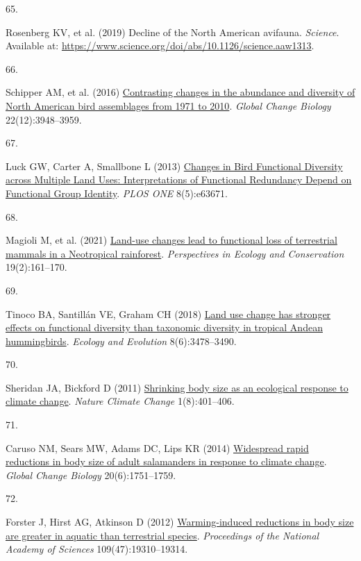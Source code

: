 \documentclass{article}
\newlength{\cslhangindent}
\newlength{\csllabelwidth}
\newlength{\cslentryspacingunit} %
\newenvironment{CSLReferences}[2] %
 {%
  \setlength{\parindent}{0pt}
  \ifodd #1
  \let\oldpar\par
  \def\par{\hangindent=\cslhangindent\oldpar}
  \fi
  \setlength{\parskip}{#2\cslentryspacingunit}
 }%
 {}
\newcommand{\CSLLeftMargin}[1]{\parbox[t]{\csllabelwidth}{#1}}
\newcommand{\CSLRightInline}[1]{\parbox[t]{\linewidth - \csllabelwidth}{#1}\break}
\begin{document}
\begin{CSLReferences}{0}{0}
\leavevmode{}%
\CSLLeftMargin{65. }%
\CSLRightInline{Rosenberg KV, et al. (2019) Decline of the North
American avifauna. \emph{Science}. Available at:
\url{https://www.science.org/doi/abs/10.1126/science.aaw1313}.}

\leavevmode{}%
\CSLLeftMargin{66. }%
\CSLRightInline{Schipper AM, et al. (2016)
\href{https://doi.org/10.1111/gcb.13292}{Contrasting changes in the
abundance and diversity of North American bird assemblages from 1971 to
2010}. \emph{Global Change Biology} 22(12):3948--3959.}

\leavevmode{}%
\CSLLeftMargin{67. }%
\CSLRightInline{Luck GW, Carter A, Smallbone L (2013)
\href{https://doi.org/10.1371/journal.pone.0063671}{Changes in Bird
Functional Diversity across Multiple Land Uses: Interpretations of
Functional Redundancy Depend on Functional Group Identity}. \emph{PLOS
ONE} 8(5):e63671.}

\leavevmode{}%
\CSLLeftMargin{68. }%
\CSLRightInline{Magioli M, et al. (2021)
\href{https://doi.org/10.1016/j.pecon.2021.02.006}{Land-use changes lead
to functional loss of terrestrial mammals in a Neotropical rainforest}.
\emph{Perspectives in Ecology and Conservation} 19(2):161--170.}

\leavevmode{}%
\CSLLeftMargin{69. }%
\CSLRightInline{Tinoco BA, Santillán VE, Graham CH (2018)
\href{https://doi.org/10.1002/ece3.3813}{Land use change has stronger
effects on functional diversity than taxonomic diversity in tropical
Andean hummingbirds}. \emph{Ecology and Evolution} 8(6):3478--3490.}

\leavevmode{}%
\CSLLeftMargin{70. }%
\CSLRightInline{Sheridan JA, Bickford D (2011)
\href{https://doi.org/10.1038/nclimate1259}{Shrinking body size as an
ecological response to climate change}. \emph{Nature Climate Change}
1(8):401--406.}

\leavevmode{}%
\CSLLeftMargin{71. }%
\CSLRightInline{Caruso NM, Sears MW, Adams DC, Lips KR (2014)
\href{https://doi.org/10.1111/gcb.12550}{Widespread rapid reductions in
body size of adult salamanders in response to climate change}.
\emph{Global Change Biology} 20(6):1751--1759.}

\leavevmode{}%
\CSLLeftMargin{72. }%
\CSLRightInline{Forster J, Hirst AG, Atkinson D (2012)
\href{https://doi.org/10.1073/pnas.1210460109}{Warming-induced
reductions in body size are greater in aquatic than terrestrial
species}. \emph{Proceedings of the National Academy of Sciences}
109(47):19310--19314.}


\end{CSLReferences}
\end{document}
